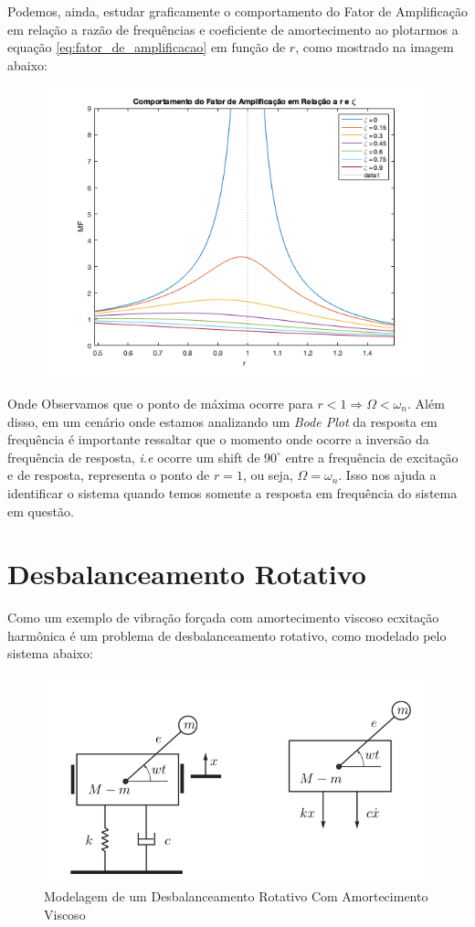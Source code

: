 \documentclass{article}
\begin{document}
Podemos, ainda, estudar graficamente o comportamento do Fator de Amplificação em relação a razão de frequências e coeficiente de amortecimento ao plotarmos a equação \ref{eq:fator_de_amplificacao} em função de $r$, como
mostrado na imagem abaixo:

\begin{figure}[h]
    \centering
    \includegraphics[width=.5\textwidth]{imgs/fator_ampl.png}
\end{figure}

Onde Observamos que o ponto de máxima ocorre para $r < 1 \Rightarrow \Omega < \omega_n$.
Além disso, em um cenário onde estamos analizando um \emph{Bode Plot} da resposta em frequência é importante ressaltar que o momento onde ocorre a inversão da frequência de resposta,
\emph{i.e} ocorre um shift de $90^\circ$ entre a frequência de excitação e de resposta, representa o ponto de $r=1$, ou seja, $\Omega = \omega_n$. Isso nos ajuda a identificar o sistema
quando temos somente a resposta em frequência do sistema em questão.

\newpage
\section{Desbalanceamento Rotativo}
Como um exemplo de vibração forçada com amortecimento viscoso ecxitação harmônica  é um problema de desbalanceamento rotativo, como modelado pelo sistema abaixo:

\begin{figure}[h]
    \centering
    \includegraphics[width=.5\textwidth]{imgs/desb_rotativo.png}
    \caption{Modelagem de um Desbalanceamento Rotativo Com Amortecimento Viscoso}
\end{figure}
\end{document}
